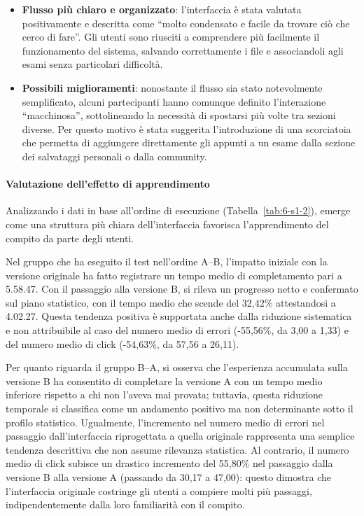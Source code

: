\begin{itemize}
	\item \textbf{Flusso più chiaro e organizzato}: l'interfaccia è stata valutata positivamente e descritta come ``molto condensato e facile da trovare ciò che cerco di fare''. Gli utenti sono riusciti a comprendere più facilmente il funzionamento del sistema, salvando correttamente i file e associandoli agli esami senza particolari difficoltà.

	\item \textbf{Possibili miglioramenti}: nonostante il flusso sia stato notevolmente semplificato, alcuni partecipanti hanno comunque definito l'interazione ``macchinosa'', sottolineando la necessità di spostarsi più volte tra sezioni diverse. Per questo motivo è stata suggerita l'introduzione di una scorciatoia che permetta di aggiungere direttamente gli appunti a un esame dalla sezione dei salvataggi personali o dalla community.

\end{itemize}

\paragraph{Valutazione dell'effetto di apprendimento}

Analizzando i dati in base all'ordine di esecuzione (Tabella~\ref{tab:6-s1-2}), emerge come una struttura più chiara dell'interfaccia favorisca l'apprendimento del compito da parte degli utenti.

Nel gruppo che ha eseguito il test nell'ordine A--B, l'impatto iniziale con la versione originale ha fatto registrare un tempo medio di completamento pari a 5.58.47. Con il passaggio alla versione B, si rileva un progresso netto e confermato sul piano statistico, con il tempo medio che scende del 32,42\% attestandosi a 4.02.27. Questa tendenza positiva è supportata anche dalla riduzione sistematica e non attribuibile al caso del numero medio di errori (-55,56\%, da 3,00 a 1,33) e del numero medio di click (-54,63\%, da 57,56 a 26,11).

Per quanto riguarda il gruppo B--A, si osserva che l'esperienza accumulata sulla versione B ha consentito di completare la versione A con un tempo medio inferiore rispetto a chi non l'aveva mai provata; tuttavia, questa riduzione temporale si classifica come un andamento positivo ma non determinante sotto il profilo statistico. Ugualmente, l'incremento nel numero medio di errori nel passaggio dall'interfaccia riprogettata a quella originale rappresenta una semplice tendenza descrittiva che non assume rilevanza statistica. Al contrario, il numero medio di click subisce un drastico incremento del 55,80\% nel passaggio dalla versione B alla versione A (passando da 30,17 a 47,00): questo dimostra che l'interfaccia originale costringe gli utenti a compiere molti più passaggi, indipendentemente dalla loro familiarità con il compito.

